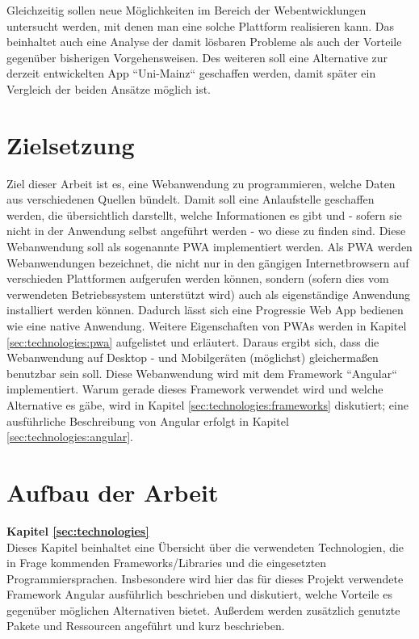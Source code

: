 Gleichzeitig sollen neue Möglichkeiten im Bereich der Webentwicklungen untersucht werden, mit denen man eine solche Plattform realisieren kann. Das beinhaltet auch eine Analyse der damit lösbaren Probleme als auch der Vorteile gegenüber bisherigen Vorgehensweisen. Des weiteren soll eine Alternative zur derzeit entwickelten App ``Uni-Mainz`` geschaffen werden, damit später ein Vergleich der beiden Ansätze möglich ist.

\section{Zielsetzung}
\label{sec:intro:aim}

Ziel dieser Arbeit ist es, eine Webanwendung zu programmieren, welche Daten aus verschiedenen Quellen bündelt. Damit soll eine Anlaufstelle geschaffen werden, die übersichtlich darstellt, welche Informationen es gibt und - sofern sie nicht in der Anwendung selbst angeführt werden - wo diese zu finden sind. Diese Webanwendung soll als sogenannte \acf{PWA} implementiert werden. Als \acs{PWA} werden Webanwendungen bezeichnet, die nicht nur in den gängigen Internetbrowsern auf verschieden Plattformen aufgerufen werden können, sondern (sofern dies vom verwendeten Betriebssystem unterstützt wird) auch als eigenständige Anwendung installiert werden können. Dadurch lässt sich eine Progressie Web App bedienen wie eine native Anwendung. Weitere Eigenschaften von PWAs werden in Kapitel \ref{sec:technologies:pwa} aufgelistet und erläutert. Daraus ergibt sich, dass die Webanwendung auf Desktop - und Mobilgeräten (möglichst) gleichermaßen benutzbar sein soll. Diese Webanwendung wird mit dem Framework ``Angular`` implementiert. Warum gerade dieses Framework verwendet wird und welche Alternative es gäbe, wird in Kapitel \ref{sec:technologies:frameworks} diskutiert; eine ausführliche Beschreibung von Angular erfolgt in Kapitel \ref{sec:technologies:angular}.

\section{Aufbau der Arbeit}
\label{sec:intro:structure}

\textbf{Kapitel \ref{sec:technologies}} \\[0.2em]
Dieses Kapitel beinhaltet eine Übersicht über die verwendeten Technologien, die in Frage kommenden Frameworks/Libraries und die eingesetzten Programmiersprachen. Insbesondere wird hier das für dieses Projekt verwendete Framework Angular ausführlich beschrieben und diskutiert, welche Vorteile es gegenüber möglichen Alternativen bietet. Außerdem werden zusätzlich genutzte Pakete und Ressourcen angeführt und kurz beschrieben.

